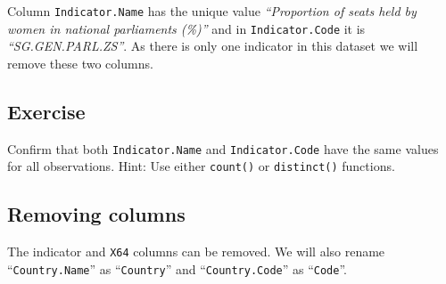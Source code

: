 \documentclass[a4paper,9pt,twocolumn,twoside,printwatermark=false]{pinp}
\begin{document}
\begin{Shaded}
\end{Shaded}

Column \texttt{Indicator.Name} has the unique value \emph{``Proportion
of seats held by women in national parliaments (\%)''} and in
\texttt{Indicator.Code} it is \emph{``SG.GEN.PARL.ZS''}. As there is
only one indicator in this dataset we will remove these two columns.

\hypertarget{exercise-2}{%
\subsection{Exercise}\label{exercise-2}}

Confirm that both \texttt{Indicator.Name} and \texttt{Indicator.Code}
have the same values for all observations. Hint: Use either
\texttt{count()} or \texttt{distinct()} functions.

\hypertarget{removing-columns}{%
\subsection{Removing columns}\label{removing-columns}}

The indicator and \texttt{X64} columns can be removed. We will also
rename ``\texttt{Country.Name}'' as ``\texttt{Country}'' and
``\texttt{Country.Code}'' as ``\texttt{Code}''.

\begin{Shaded}
\end{Shaded}
\end{document}
